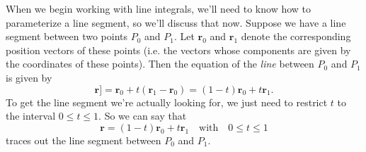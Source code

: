 \documentclass[10pt,]{book}
\theoremstyle{ptxplainnotitle}
\theoremstyle{ptxplaintitle}
\theoremstyle{ptxplainnotitle}
\theoremstyle{ptxplaintitle}
\theoremstyle{ptxplainnotitle}
\theoremstyle{ptxplaintitle}
\theoremstyle{ptxdefinitionnotitle}
\theoremstyle{ptxdefinitiontitle}
\theoremstyle{ptxdefinitionnotitle}
\theoremstyle{ptxdefinitiontitle}
\theoremstyle{ptxdefinitionnotitle}
\theoremstyle{ptxdefinitiontitle}
\theoremstyle{ptxdefinitionnotitle}
\theoremstyle{ptxdefinitiontitle}
\theoremstyle{ptxdefinitionnotitle}
\theoremstyle{ptxdefinitiontitle}
\numberwithin{equation}{section}
\newcommand{\vv}[1]{\mathbf{#1}}
\begin{document}
\hypertarget{p-869}{}%
When we begin working with line integrals, we'll need to know how to parameterize a line segment, so we'll discuss that now. Suppose we have a line segment between two points \(P_{0}\) and \(P_{1}\). Let \(\vv{r}_{0}\) and \(\vv{r}_{1}\) denote the corresponding position vectors of these points (i.e. the vectors whose components are given by the coordinates of these points). Then the equation of the \emph{line} between \(P_{0}\) and \(P_{1}\) is given by%
%
\begin{equation*}
\vv{r}] = \vv{r}_{0}+t(\vv{r}_{1}-\vv{r}_{0}) = (1-t)\vv{r}_{0}+t\vv{r}_{1}.
\end{equation*}
\hypertarget{p-870}{}%
To get the line segment we're actually looking for, we just need to restrict \(t\) to the interval \(0\leq t\leq 1\). So we can say that%
%
\begin{equation*}
\vv{r} = (1-t)\vv{r}_{0}+t\vv{r}_{1} \quad\text{with}\quad0\leq t\leq 1
\end{equation*}
\hypertarget{p-871}{}%
traces out the line segment between \(P_{0}\) and \(P_{1}\).%
\typeout{************************************************}
\typeout{************************************************}
\end{document}
